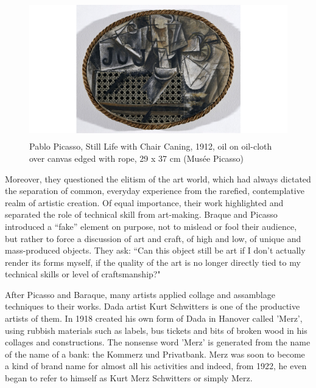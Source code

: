 

\begin{figure}[h!]
  \centering
  \includegraphics[height=6cm]{graphics/picasso_chair.png}
  \caption{Pablo Picasso, Still Life with Chair Caning, 1912, oil on oil-cloth over canvas edged with rope, 29 x 37 cm (Musée Picasso)}
  \label{fig:Picasso_Chair}
\end{figure}

Moreover, they questioned the elitism of the art world, which had always dictated the separation of common, everyday experience from the rarefied, contemplative realm of artistic creation. Of equal importance, their work highlighted and separated the role of technical skill from art-making. Braque and Picasso introduced a “fake” element on purpose, not to mislead or fool their audience, but rather to force a discussion of art and craft, of high and low, of unique and mass-produced objects. They ask: “Can this object still be art if I don’t actually render its forms myself, if the quality of the art is no longer directly tied to my technical skills or level of craftsmanship?"

After Picasso and Baraque, many artists applied collage and assamblage techniques to their works. Dada artist Kurt Schwitters is one of the productive artists of them. In 1918 created his own form of Dada in Hanover called 'Merz', using rubbish materials such as labels, bus tickets and bits of broken wood in his collages and constructions. The nonsense word 'Merz' is generated from the name of the name of a bank: the Kommerz und Privatbank. Merz was soon to become a kind of brand name for almost all his activities and indeed, from 1922, he even began to refer to himself as Kurt Merz Schwitters or simply Merz.


